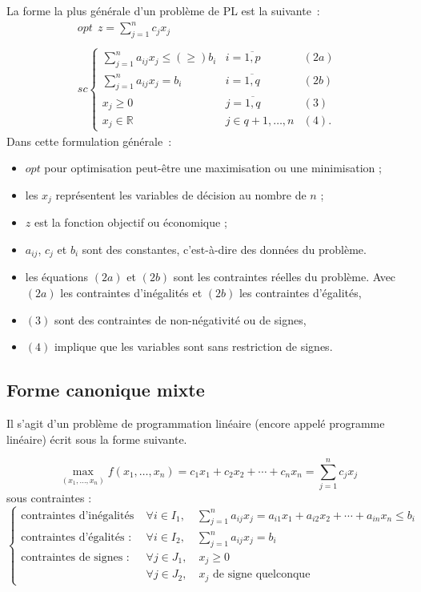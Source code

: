 \documentclass[a4paper,12pt,openany]{book}
\theoremstyle{plain}
\theoremstyle{definition}
\theoremstyle{remark}
\theoremstyle{nbstyle}
\begin{document}
	La forme la plus générale d'un problème de PL est la suivante :
	\begin{equation*}\label{key}
	\begin{array}{lc}
	opt\:\: z =\displaystyle\sum_{j=1}^{n}c_{j}x_{j}\\
	\\
	sc \left\lbrace \begin{array}{llc}
	\displaystyle\sum_{j=1}^{n}a_{ij}x_{j}\leq (\geq) b_{i}&i=\overline{1,p}& (2a)\\
	\displaystyle\sum_{j=1}^{n}a_{ij}x_{j}= b_{i}&i=\overline{1,q}& (2b)\\
	x_{j}\geq 0&j=\overline{1,q}& (3)\\
	x_{j}\in \mathbb{R}& j\in q+1,\ldots,n& (4).
	\end{array}\right.
	\end{array}
	\end{equation*}
	Dans cette formulation générale :
	\begin{itemize}
		\item[$\diamond $] $ opt $ pour optimisation peut-être une maximisation ou une minimisation ;
		\item[$\diamond $] les $ x_{j} $ représentent les variables de décision au nombre de $ n $ ;
		\item[$\diamond $] $ z $ est la fonction objectif ou économique ;
		\item[$\diamond $] $ a_{ij} $, $ c_{j} $ et $ b_{i} $ sont des constantes, c'est-à-dire des données du problème.
		\item[$\diamond $] les équations $ (2a) $ et $ (2b) $ sont les contraintes réelles du problème. Avec $ (2a) $ les contraintes d'inégalités et $ (2b) $ les contraintes d'égalités,
		\item[$\diamond $] $ (3) $ sont des contraintes de non-négativité ou de signes,
		\item[$\diamond $] $ (4) $ implique que les variables sont sans restriction de signes.
	\end{itemize}
	
	\subsection{Forme canonique mixte}
	
	Il s'agit d'un problème de programmation linéaire (encore appelé programme linéaire) écrit sous la forme suivante.
	
	\[
	\displaystyle\max_{(x_1, \ldots, x_n)} f(x_1, \ldots, x_n) = c_1 x_1 + c_2 x_2 + \cdots + c_n x_n = \sum_{j=1}^n c_j x_j
	\]
	sous contraintes :
	\[
	\begin{cases}
	\text{contraintes d'inégalités : } & \forall i \in I_1, \quad \sum_{j=1}^n a_{ij} x_j = a_{i1} x_1 + a_{i2} x_2 + \cdots + a_{in} x_n \leq b_i \\
	\text{contraintes d'égalités : } & \forall i \in I_2, \quad \sum_{j=1}^n a_{ij} x_j = b_i \\
	\text{contraintes de signes : } & \forall j \in J_1, \quad x_j \geq 0 \\
	& \forall j \in J_2, \quad x_j \text{ de signe quelconque}
	\end{cases}
	\]
	
\end{document}
